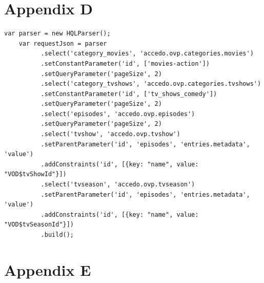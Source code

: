 \begin{appendices}
\chapter{Appendix D}

\begin{lstlisting}[frame=single,linewidth=15cm,breaklines=true,caption=HQL usage]
	var parser = new HQLParser();
	var requestJson = parser
		  .select('category_movies', 'accedo.ovp.categories.movies')
		  .setConstantParameter('id', ['movies-action'])
		  .setQueryParameter('pageSize', 2)
		  .select('category_tvshows', 'accedo.ovp.categories.tvshows')
		  .setConstantParameter('id', ['tv_shows_comedy'])
		  .setQueryParameter('pageSize', 2)
		  .select('episodes', 'accedo.ovp.episodes')
		  .setQueryParameter('pageSize', 2)
		  .select('tvshow', 'accedo.ovp.tvshow')
		  .setParentParameter('id', 'episodes', 'entries.metadata', 'value')
		  .addConstraints('id', [{key: "name", value: "VOD$tvShowId"}])
		  .select('tvseason', 'accedo.ovp.tvseason')
		  .setParentParameter('id', 'episodes', 'entries.metadata', 'value')
		  .addConstraints('id', [{key: "name", value: "VOD$tvSeasonId"}])
		  .build();

\end{lstlisting}

\chapter{Appendix E}


\end{appendices}
